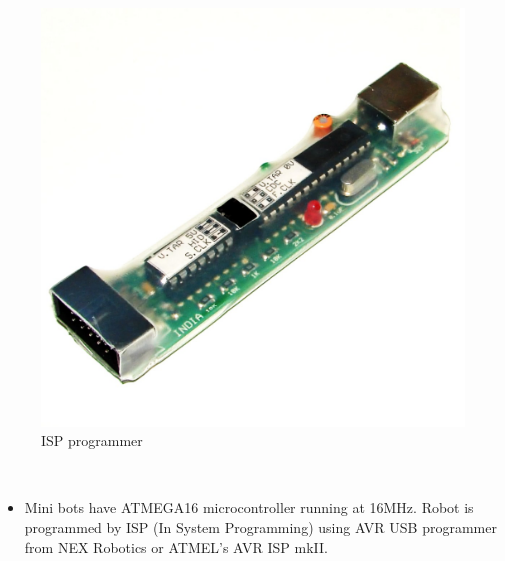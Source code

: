 \documentclass[a4paper,12pt,oneside]{book}
\begin{document}
	\hfill\\
	\begin{figure}[h!]
		\caption{ISP programmer}
		\includegraphics[width=\textwidth]{./HardwareManual/ISP_programmer.png}
	\end{figure}	
	\hfill\\
	
	\begin{itemize}
	\item{Mini bots have ATMEGA16 microcontroller running at 16MHz. Robot is programmed by ISP (In System Programming) using AVR USB programmer from NEX
		Robotics or ATMEL’s AVR ISP mkII.}
	\end{itemize}
	\newpage
	\hfill\\
	
\end{document}
